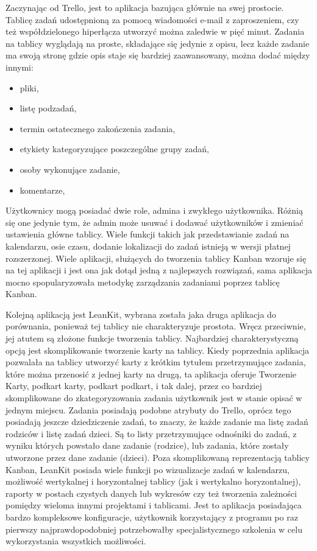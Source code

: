 \indent  Zaczynając od Trello, jest to aplikacja bazująca głównie na swej prostocie. Tablicę zadań udostępnioną za pomocą wiadomości e-mail z zaproszeniem, czy też współdzielonego hiperłącza  utworzyć można zaledwie w pięć minut. Zadania na tablicy wyglądają na proste, składające się jedynie z opisu, lecz każde zadanie ma swoją stronę gdzie opis staje się bardziej zaawansowany, można dodać między innymi:
\begin{itemize}
	\item pliki, 
	\item listę podzadań,
	\item termin ostatecznego zakończenia zadania,
	\item etykiety kategoryzujące poszczególne grupy zadań,
	\item osoby wykonujące zadanie,
	\item komentarze,
\end{itemize}
Użytkownicy mogą posiadać dwie role,  admina i zwykłego użytkownika. Różnią się one jedynie tym, że admin może usuwać i dodawać użytkowników i zmieniać ustawienia główne tablicy. Wiele funkcji takich jak przedstawianie zadań na kalendarzu, osie czasu, dodanie lokalizacji do zadań istnieją w wersji płatnej rozszerzonej.
Wiele aplikacji, służących do tworzenia tablicy Kanban wzoruje się na tej aplikacji i jest ona jak dotąd jedną z najlepszych rozwiązań, sama aplikacja mocno spopularyzowała metodykę zarządzania zadaniami poprzez tablicę Kanban.


\indent  Kolejną aplikacją jest LeanKit, wybrana została jaka druga aplikacja do porównania, ponieważ tej tablicy nie charakteryzuje prostota. Wręcz przeciwnie, jej atutem są złożone funkcje tworzenia tablicy. Najbardziej charakterystyczną opcją jest skomplikowanie tworzenie karty na tablicy. Kiedy poprzednia aplikacja pozwalała  na tablicy utworzyć karty z krótkim tytułem przetrzymujące zadania, które można przenosić z jednej karty na drugą, ta aplikacja oferuje Tworzenie Karty, podkart karty, podkart podkart, i tak dalej, przez co bardziej skomplikowane do zkategoryzowania zadania użytkownik jest w stanie opisać w jednym miejscu. Zadania posiadają podobne atrybuty do Trello, oprócz tego posiadają jeszcze dziedziczenie zadań, to znaczy, że każde zadanie ma listę zadań rodziców i listę zadań dzieci. Są to listy przetrzymujące odnośniki do zadań, z wyniku których powstało dane zadanie (rodzice), lub zadania, które zostały utworzone przez dane zadanie (dzieci). 
Poza skomplikowaną reprezentacją tablicy Kanban, LeanKit posiada wiele funkcji po wizualizacje zadań w kalendarzu, możliwość wertykalnej i horyzontalnej tablicy (jak i wertykalno horyzontalnej), raporty w postach czystych danych lub wykresów czy też tworzenia zależności pomiędzy wieloma innymi projektami i tablicami.
Jest to aplikacja posiadająca bardzo kompleksowe konfiguracje, użytkownik korzystający z programu po raz pierwszy najprawdopodobniej potrzebowałby specjalistycznego szkolenia w celu wykorzystania wszystkich możliwości.



